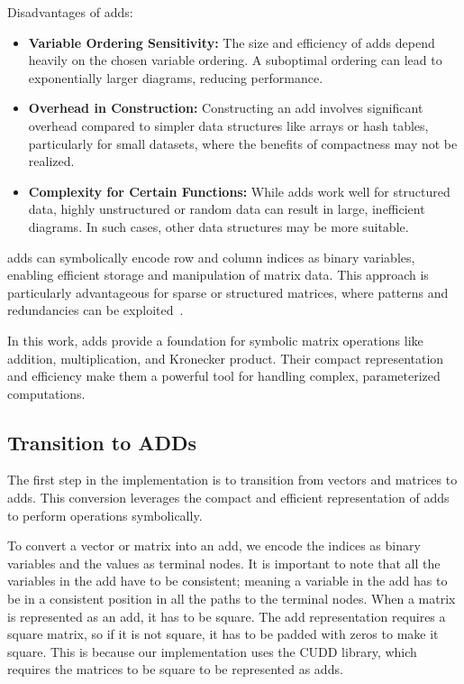 Disadvantages of \glspl{add}:
\begin{itemize}
\item \textbf{Variable Ordering Sensitivity:} The size and efficiency of \glspl{add} depend heavily on the chosen variable ordering. A suboptimal ordering can lead to exponentially larger diagrams, reducing performance.
\item \textbf{Overhead in Construction:} Constructing an \gls{add} involves significant overhead compared to simpler data structures like arrays or hash tables, particularly for small datasets, where the benefits of compactness may not be realized.
\item \textbf{Complexity for Certain Functions:} While \glspl{add} work well for structured data, highly unstructured or random data can result in large, inefficient diagrams. In such cases, other data structures may be more suitable.
\end{itemize}

\glspl{add} can symbolically encode row and column indices as binary variables, enabling efficient storage and manipulation of matrix data.
This approach is particularly advantageous for sparse or structured matrices, where patterns and redundancies can be exploited~\cite{bahar1997algebric}.

In this work, \glspl{add} provide a foundation for symbolic matrix operations like addition, multiplication, and Kronecker product. Their compact representation and efficiency make them a powerful tool for handling complex, parameterized computations.

\subsection{Transition to ADDs}\label{subsec:transition-to-adds}
The first step in the implementation is to transition from vectors and matrices to \glspl{add}.
This conversion leverages the compact and efficient representation of \glspl{add} to perform operations symbolically.

To convert a vector or matrix into an \gls{add}, we encode the indices as binary variables and the values as terminal nodes.
It is important to note that all the variables in the \gls{add} have to be consistent; meaning a variable in the \gls{add} has to be in a consistent position in all the paths to the terminal nodes.
When a matrix is represented as an \gls{add}, it has to be square. 
The \gls{add} representation requires a square matrix, so if it is not square, it has to be padded with zeros to make it square.
This is because our implementation uses the CUDD library, which requires the matrices to be square to be represented as \glspl{add}.

